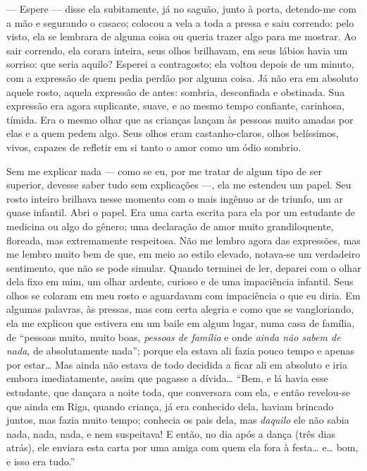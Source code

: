 --- Espere --- disse ela subitamente, já no saguão, junto à porta,
detendo-me com a mão e segurando o casaco; colocou a vela a toda a
pressa e saiu correndo: pelo visto, ela se lembrara de alguma coisa ou
queria trazer algo para me mostrar. Ao sair correndo, ela corara
inteira, seus olhos brilhavam, em seus lábios havia um sorriso: que
seria aquilo? Esperei a contragosto; ela voltou depois de um minuto,
com a expressão de quem pedia perdão por alguma coisa. Já não era em
absoluto aquele rosto, aquela expressão de antes: sombria, desconfiada
e obstinada. Sua expressão era agora suplicante, suave, e ao mesmo
tempo confiante, carinhosa, tímida. Era o mesmo olhar que as crianças
lançam às pessoas muito amadas por elas e a quem pedem algo. Seus olhos
eram castanho-claros, olhos belíssimos, vivos, capazes de refletir em
si tanto o amor como um ódio sombrio.

Sem me explicar nada --- como se eu, por me tratar de algum tipo de ser
superior, devesse saber tudo sem explicações ---, ela me estendeu um papel. Seu
rosto inteiro brilhava nesse momento com o mais ingênuo ar de triunfo, um ar
quase infantil. Abri o papel. Era uma carta escrita para ela por um estudante
de medicina ou algo do gênero; uma declaração de amor muito grandiloquente,
floreada, mas extremamente respeitosa.  Não me lembro agora das expressões, mas
me lembro muito bem de que, em meio ao estilo elevado, notava-se um verdadeiro
sentimento, que não se pode simular. Quando terminei de ler, deparei com o
olhar dela fixo em mim, um olhar ardente, curioso e de uma impaciência
infantil. Seus olhos se colaram em meu rosto e aguardavam com impaciência o que
eu diria. Em algumas palavras, às pressas, mas com certa alegria e como que se
vangloriando, ela me explicou que estivera em um baile em algum lugar, numa
casa de família, de “pessoas muito, muito boas, \textit{pessoas de família} e
onde \textit{ainda não sabem de nada}, de absolutamente nada”; porque ela
estava ali fazia pouco tempo e apenas por estar\ldots{} Mas ainda não estava de
todo decidida a ficar ali em absoluto e iria embora imediatamente, assim que
pagasse a dívida\ldots{} “Bem, e lá havia esse estudante, que dançara a noite
toda, que conversara com ela, e então revelou-se que ainda em Riga, quando
criança, já era conhecido dela, haviam brincado juntos, mas fazia muito tempo;
conhecia os pais dela, mas \textit{daquilo} ele não sabia nada, nada, nada, e
nem suspeitava! E então, no dia após a dança (três dias atrás), ele enviara
esta carta por uma amiga com quem ela fora à festa\ldots{} e\ldots{} bom, e
isso era tudo.”

